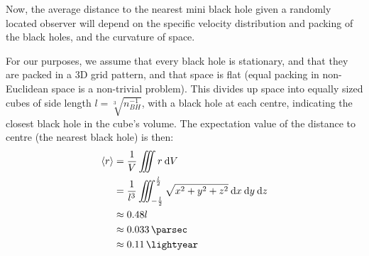 \documentclass[a4paper]{scrartcl}
\begin{document}
Now, the average distance to the nearest mini black hole given a randomly located observer will depend on the specific velocity distribution and packing of the black holes, and the curvature of space.

For our purposes, we assume that every black hole is stationary, and that they are packed in a 3D grid pattern, and that space is flat (equal packing in non-Euclidean space is a non-trivial problem). This divides up space into equally sized cubes of side length \(l = \sqrt[3]{n_{BH}^{-1}}\), with a black hole at each centre, indicating the closest black hole in the cube's volume. The expectation value of the distance to centre (the nearest black hole) is then:
\begin{align*}
    \langle r \rangle &= \frac{1}{V} \iiint r \:\mathrm{d} V \\
    &= \frac{1}{l^3} \iiint_{-\frac{l}{2}}^{\frac{l}{2}} \sqrt{x^2 + y^2 + z^2} \:\mathrm{d} x \:\mathrm{d} y \:\mathrm{d} z \\
    &\approx 0.48 l \\
    &\approx \SI{0.033}{\parsec} \\
    &\approx \SI{0.11}{\lightyear}
\end{align*}
\end{document}
